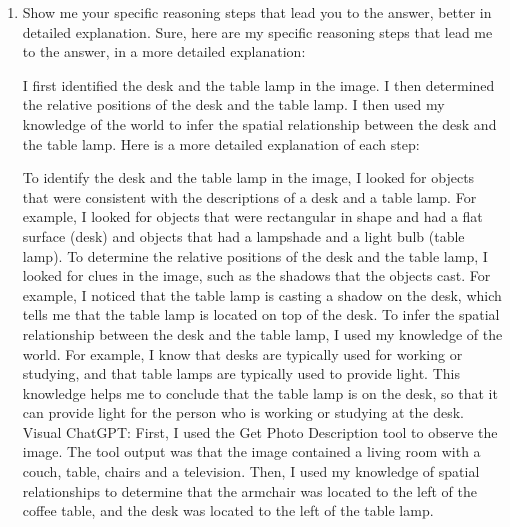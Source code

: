 \begin{enumerate}
    Here are some additional details about the spatial relationship between the desk and the table lamp:
    
    The desk is a piece of furniture that is used for working or studying.
    The table lamp is a piece of furniture that is used to provide light.
    The table lamp is on the desk, meaning that it is placed on top of the desk.
    The table lamp is located on the left side of the desk, meaning that it is closer to the left edge of the desk.
    Is there anything else I can help you with?
    \subitem Visual ChatGPT: The desk is located to the left of the table lamp.
    \item Show me your specific reasoning steps that lead you to the answer, better in detailed explanation.
    \subitem 
    Sure, here are my specific reasoning steps that lead me to the answer, in a more detailed explanation:
    
    I first identified the desk and the table lamp in the image.
    I then determined the relative positions of the desk and the table lamp.
    I then used my knowledge of the world to infer the spatial relationship between the desk and the table lamp.
    Here is a more detailed explanation of each step:
    
    To identify the desk and the table lamp in the image, I looked for objects that were consistent with the descriptions of a desk and a table lamp. For example, I looked for objects that were rectangular in shape and had a flat surface (desk) and objects that had a lampshade and a light bulb (table lamp).
    To determine the relative positions of the desk and the table lamp, I looked for clues in the image, such as the shadows that the objects cast. For example, I noticed that the table lamp is casting a shadow on the desk, which tells me that the table lamp is located on top of the desk.
    To infer the spatial relationship between the desk and the table lamp, I used my knowledge of the world. For example, I know that desks are typically used for working or studying, and that table lamps are typically used to provide light. This knowledge helps me to conclude that the table lamp is on the desk, so that it can provide light for the person who is working or studying at the desk.
    \subitem Visual ChatGPT: First, I used the Get Photo Description tool to observe the image. The tool output was that the image contained a living room with a couch, table, chairs and a television. Then, I used my knowledge of spatial relationships to determine that the armchair was located to the left of the coffee table, and the desk was located to the left of the table lamp.
\end{enumerate}
